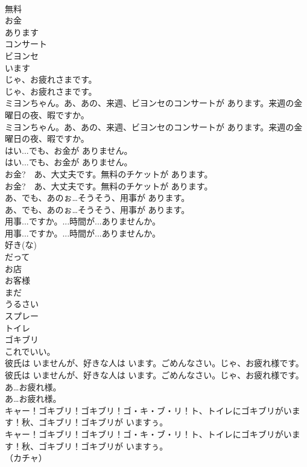 \documentclass[8pt]{extreport}
\begin{document}
\begin{CJK}{UTF8}{min}
\\	無料
\\	お金
\\	あります
\\	コンサート
\\	ビヨンセ
\\	います
\\	じゃ、お疲れさまです。	
\\	じゃ、お疲れさまです。 
\\	ミヨンちゃん。あ、あの、来週、ビヨンセのコンサートが あります。来週の金曜日の夜、暇ですか。	
\\	ミヨンちゃん。あ、あの、来週、ビヨンセのコンサートが あります。来週の金曜日の夜、暇ですか。 
\\	はい...でも、お金が ありません。	
\\	はい...でも、お金が ありません。 
\\	お金?　あ、大丈夫です。無料のチケットが あります。	
\\	お金?　あ、大丈夫です。無料のチケットが あります。 
\\	あ、でも、あのぉ…そうそう、用事が あります。	
\\	あ、でも、あのぉ…そうそう、用事が あります。 
\\	用事...ですか。...時間が...ありませんか。	
\\	用事...ですか。...時間が...ありませんか。 
\\	好き(な)
\\	だって
\\	お店
\\	お客様
\\	まだ
\\	うるさい
\\	スプレー
\\	トイレ
\\	ゴキブリ
\\	これでいい。
\\	彼氏は いませんが、好きな人は います。ごめんなさい。じゃ、お疲れ様です。	
\\	彼氏は いませんが、好きな人は います。ごめんなさい。じゃ、お疲れ様です。 
\\	あ…お疲れ様。	
\\	あ…お疲れ様。 
\\	キャー！ゴキブリ！ゴキブリ！ゴ・キ・ブ・リ！ト、トイレにゴキブリがいます！秋、ゴキブリ！ゴキブリが いますぅ。	
\\	キャー！ゴキブリ！ゴキブリ！ゴ・キ・ブ・リ！ト、トイレにゴキブリがいます！秋、ゴキブリ！ゴキブリが いますぅ。 
\\	（カチャ）	

\end{CJK}
\end{document}
